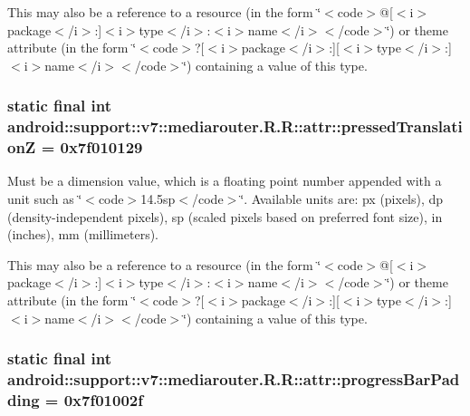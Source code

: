 This may also be a reference to a resource (in the form \char`\"{}$<$code$>$@\mbox{[}$<$i$>$package$<$/i$>$:\mbox{]}$<$i$>$type$<$/i$>$:$<$i$>$name$<$/i$>$$<$/code$>$\char`\"{}) or theme attribute (in the form \char`\"{}$<$code$>$?\mbox{[}$<$i$>$package$<$/i$>$:\mbox{]}\mbox{[}$<$i$>$type$<$/i$>$:\mbox{]}$<$i$>$name$<$/i$>$$<$/code$>$\char`\"{}) containing a value of this type. \hypertarget{classandroid_1_1support_1_1v7_1_1mediarouter_1_1_r_1_1attr_6d9d11ef9e05432f02b88c0982e5792b}{
\subsubsection[{pressedTranslationZ}]{\setlength{\rightskip}{0pt plus 5cm}static final int android::support::v7::mediarouter.R.R::attr::pressedTranslationZ = 0x7f010129}}
\label{classandroid_1_1support_1_1v7_1_1mediarouter_1_1_r_1_1attr_6d9d11ef9e05432f02b88c0982e5792b}


Must be a dimension value, which is a floating point number appended with a unit such as \char`\"{}$<$code$>$14.5sp$<$/code$>$\char`\"{}. Available units are: px (pixels), dp (density-independent pixels), sp (scaled pixels based on preferred font size), in (inches), mm (millimeters). 

This may also be a reference to a resource (in the form \char`\"{}$<$code$>$@\mbox{[}$<$i$>$package$<$/i$>$:\mbox{]}$<$i$>$type$<$/i$>$:$<$i$>$name$<$/i$>$$<$/code$>$\char`\"{}) or theme attribute (in the form \char`\"{}$<$code$>$?\mbox{[}$<$i$>$package$<$/i$>$:\mbox{]}\mbox{[}$<$i$>$type$<$/i$>$:\mbox{]}$<$i$>$name$<$/i$>$$<$/code$>$\char`\"{}) containing a value of this type. \hypertarget{classandroid_1_1support_1_1v7_1_1mediarouter_1_1_r_1_1attr_93ca2ead75fa8f165b93e96d33e32093}{
\subsubsection[{progressBarPadding}]{\setlength{\rightskip}{0pt plus 5cm}static final int android::support::v7::mediarouter.R.R::attr::progressBarPadding = 0x7f01002f}}
\label{classandroid_1_1support_1_1v7_1_1mediarouter_1_1_r_1_1attr_93ca2ead75fa8f165b93e96d33e32093}



